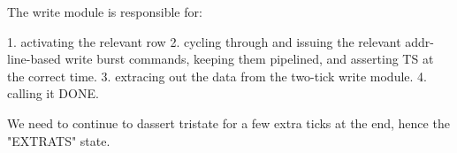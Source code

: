The write module is responsible for: 

1. activating the relevant row
2. cycling through and issuing the relevant addr-line-based write burst commands, keeping them pipelined, and asserting TS at the correct time. 
3. extracing out the data from the two-tick write module. 
4. calling it DONE. 

We need to continue to dassert tristate for a few extra ticks at the end, hence the "EXTRATS" state. 



